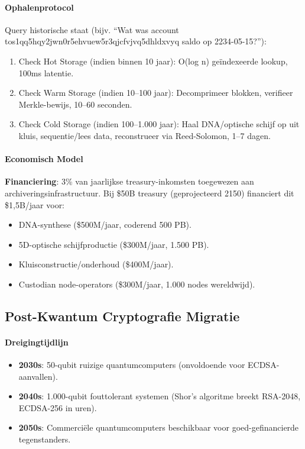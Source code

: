 \documentclass[11pt]{article}
\begin{document}
\paragraph{Ophalenprotocol}
Query historische staat (bijv. ``Wat was account tos1qq5hqy2jwn0r5ehvuew5r3qjcfvjvq5dhldxvyq saldo op 2234-05-15?''):
\begin{enumerate}[noitemsep]
  \item Check Hot Storage (indien binnen 10 jaar): O(log n) geïndexeerde lookup, 100ms latentie.
  \item Check Warm Storage (indien 10--100 jaar): Decomprimeer blokken, verifieer Merkle-bewijs, 10--60 seconden.
  \item Check Cold Storage (indien 100--1.000 jaar): Haal DNA/optische schijf op uit kluis, sequentie/lees data, reconstrueer via Reed-Solomon, 1--7 dagen.
\end{enumerate}

\paragraph{Economisch Model}
\textbf{Financiering}: 3\% van jaarlijkse treasury-inkomsten toegewezen aan archiveringsinfrastructuur. Bij \$50B treasury (geprojecteerd 2150) financiert dit \$1,5B/jaar voor:
\begin{itemize}[noitemsep]
  \item DNA-synthese (\$500M/jaar, coderend 500 PB).
  \item 5D-optische schijfproductie (\$300M/jaar, 1.500 PB).
  \item Kluisconstructie/onderhoud (\$400M/jaar).
  \item Custodian node-operators (\$300M/jaar, 1.000 nodes wereldwijd).
\end{itemize}

\subsection{Post-Kwantum Cryptografie Migratie}

\paragraph{Dreigingtijdlijn}
\begin{itemize}[noitemsep]
  \item \textbf{2030s}: 50-qubit ruizige quantumcomputers (onvoldoende voor ECDSA-aanvallen).
  \item \textbf{2040s}: 1.000-qubit fouttolerant systemen (Shor's algoritme breekt RSA-2048, ECDSA-256 in uren).
  \item \textbf{2050s}: Commerciële quantumcomputers beschikbaar voor goed-gefinancierde tegenstanders.
\end{itemize}
\end{document}
